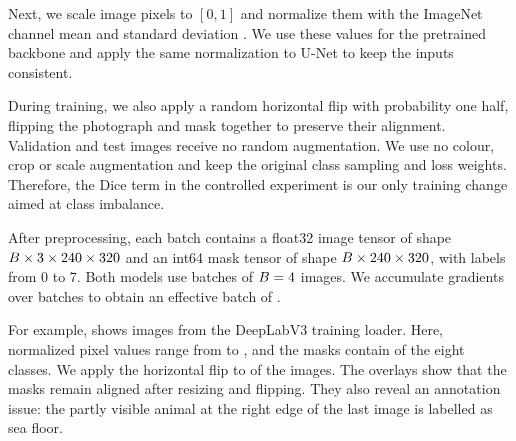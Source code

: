 Next, we scale image pixels to $[0,1]$ and normalize them with the ImageNet
channel mean \suimNormMean{} and standard deviation \suimNormStd{}. We use
these values for the pretrained backbone and apply the same normalization to
U-Net to keep the inputs consistent.

During training, we also apply a random horizontal flip with probability one
half, flipping the photograph and mask together to preserve their alignment.
Validation and test images receive no random augmentation. We use no colour,
crop or scale augmentation and keep the original class sampling and loss
weights. Therefore, the Dice term in the controlled experiment is our only
training change aimed at class imbalance.

After preprocessing, each batch contains a float32 image tensor of shape
$B\times3\times240\times320$ and an int64 mask tensor
of shape $B\times240\times320$, with labels from 0 to 7.
Both models use batches of $B=4{}$ images. We accumulate gradients over
\suimAccumulation{} batches to obtain an effective batch of
\suimEffectiveBatch{}.

For example,  shows \suimExampleBatchSize{} images
from the DeepLabV3 training loader. Here, normalized pixel values range from
\suimExampleValueMin{} to \suimExampleValueMax{}, and the masks contain
\suimExampleClasses{} of the eight classes. We apply the horizontal flip to
\suimExampleFlipped{} of the \suimExampleBatchSize{} images. The overlays show that the masks
remain aligned after resizing and flipping. They also reveal an annotation
issue: the partly visible animal at the right edge of the last image is labelled
as sea floor.

